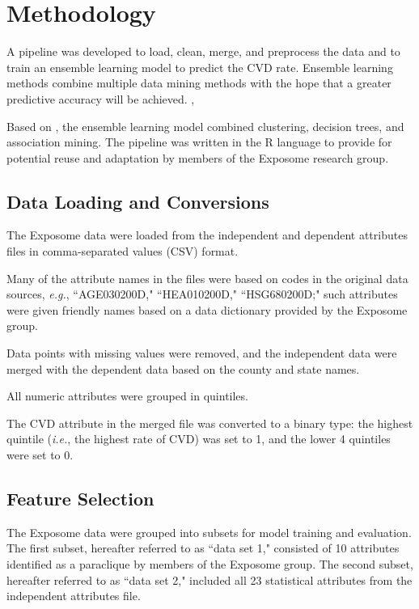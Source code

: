 \documentclass[conference,compsoc]{IEEEtran}
\begin{document}
\section{Methodology}

A pipeline was developed to load, clean, merge, and preprocess the data and to train an ensemble learning model to predict the
CVD rate. Ensemble learning methods combine multiple data mining methods with the hope that a greater predictive accuracy will be achieved. \cite{bramer}, \cite{aggarwal}

Based on \cite{datta}, the ensemble learning model combined clustering, decision trees, and association mining. The pipeline was written
in the R language to provide for potential reuse and adaptation by members of the Exposome research group.

\subsection{Data Loading and Conversions}

The Exposome data were loaded from the independent and dependent attributes files in comma-separated values (CSV) format.

Many of the attribute names in the files were based on codes in the original data sources, \textit{e.g.}, ``AGE030200D," ``HEA010200D," ``HSG680200D;"
such attributes were given friendly names based on a data dictionary provided by the Exposome group.

Data points with missing values were removed, and the independent data were merged with the dependent data based on the county and state names.

All numeric attributes were grouped in quintiles.

The CVD attribute in the merged file was converted to a binary type: the highest quintile (\textit{i.e.}, the highest rate of CVD) was set to 1,
and the lower 4 quintiles were set to 0.

\subsection{Feature Selection}

The Exposome data were grouped into subsets for model training and evaluation. The first subset, hereafter referred to as ``data set 1,"
consisted of 10 attributes identified as a paraclique by members of the Exposome group. The second subset, hereafter referred to as ``data set 2,"
included all 23 statistical attributes from the independent attributes file.
\end{document}
